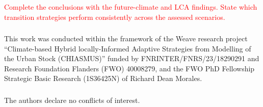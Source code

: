 \documentclass[runningheads]{llncs}
\newcommand{\TODO}[1]{\textcolor{red}{#1}}
\begin{document}
\TODO{Complete the conclusions with the future-climate and LCA findings. State which transition strategies perform consistently across the assessed scenarios.}

\begin{credits}
\subsubsection{\ackname}
This work was conducted within the framework of the Weave research project “Climate-based Hybrid locally-Informed Adaptive Strategies from Modelling of the Urban Stock (CHIASMUS)” funded by FNRINTER/FNRS/23/18290291 and Research Foundation Flanders (FWO) 40008279, and the FWO PhD Fellowship Strategic Basic Research (1S36425N) of Richard Dean Morales.

\subsubsection{\discintname}
The authors declare no conflicts of interest.
\end{credits}



\end{document}
